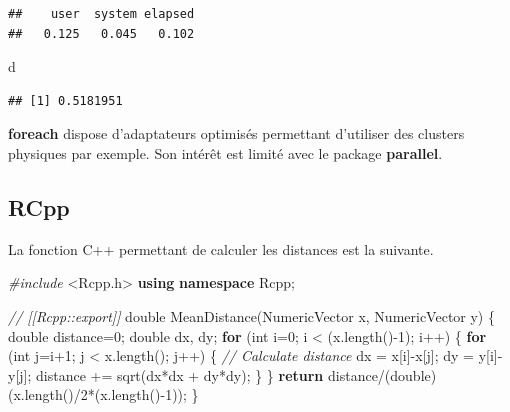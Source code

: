 \documentclass[
  12pt,
  french,
  a4paper,
  extrafontsizes,onecolumn,openright
  ]{memoir}
\newenvironment{Shaded}{\begin{snugshade}}{\end{snugshade}}
\newcommand{\CommentTok}[1]{\textcolor[rgb]{0.56,0.35,0.01}{\textit{#1}}}
\newcommand{\ControlFlowTok}[1]{\textcolor[rgb]{0.13,0.29,0.53}{\textbf{#1}}}
\newcommand{\DataTypeTok}[1]{\textcolor[rgb]{0.13,0.29,0.53}{#1}}
\newcommand{\DecValTok}[1]{\textcolor[rgb]{0.00,0.00,0.81}{#1}}
\newcommand{\ImportTok}[1]{#1}
\newcommand{\KeywordTok}[1]{\textcolor[rgb]{0.13,0.29,0.53}{\textbf{#1}}}
\newcommand{\NormalTok}[1]{#1}
\newcommand{\PreprocessorTok}[1]{\textcolor[rgb]{0.56,0.35,0.01}{\textit{#1}}}
\begin{document}
\begin{verbatim}
##    user  system elapsed 
##   0.125   0.045   0.102
\end{verbatim}

\begin{Shaded}
\begin{Highlighting}[]
\NormalTok{d}
\end{Highlighting}
\end{Shaded}

\begin{verbatim}
## [1] 0.5181951
\end{verbatim}

\normalsize

\textbf{foreach} dispose d'adaptateurs optimisés permettant d'utiliser des clusters physiques par exemple.
Son intérêt est limité avec le package \textbf{parallel}.

\hypertarget{rcpp}{%
\subsection{RCpp}\label{rcpp}}

La fonction C++ permettant de calculer les distances est la suivante.

\scriptsize

\begin{Shaded}
\begin{Highlighting}[]
\PreprocessorTok{#include }\ImportTok{<Rcpp.h>}
\KeywordTok{using} \KeywordTok{namespace}\NormalTok{ Rcpp;}

\CommentTok{// [[Rcpp::export]]}
\DataTypeTok{double}\NormalTok{ MeanDistance(NumericVector x, NumericVector y) \{}
  \DataTypeTok{double}\NormalTok{ distance=}\DecValTok{0}\NormalTok{;}
  \DataTypeTok{double}\NormalTok{ dx, dy;}
  \ControlFlowTok{for}\NormalTok{ (}\DataTypeTok{int}\NormalTok{ i=}\DecValTok{0}\NormalTok{; i < (x.length()-}\DecValTok{1}\NormalTok{); i++) \{}
    \ControlFlowTok{for}\NormalTok{ (}\DataTypeTok{int}\NormalTok{ j=i+}\DecValTok{1}\NormalTok{; j < x.length(); j++) \{}
    \CommentTok{// Calculate distance}
\NormalTok{        dx = x[i]-x[j];}
\NormalTok{        dy = y[i]-y[j];}
\NormalTok{        distance += sqrt(dx*dx + dy*dy);}
\NormalTok{    \}}
\NormalTok{  \}}
  \ControlFlowTok{return}\NormalTok{ distance/(}\DataTypeTok{double}\NormalTok{)(x.length()/}\DecValTok{2}\NormalTok{*(x.length()-}\DecValTok{1}\NormalTok{));}
\NormalTok{\}}
\end{Highlighting}
\end{Shaded}
\end{document}
